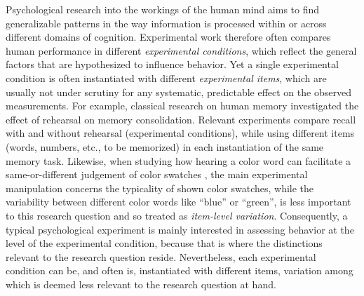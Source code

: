 \documentclass[fleqn]{article}
\begin{document}
Psychological research into the workings of the human mind aims to find generalizable patterns in the way information is processed within or across different domains of cognition.
Experimental work therefore often compares human performance in different \emph{experimental conditions}, which reflect the general factors that are hypothesized to influence behavior.
Yet a single experimental condition is often instantiated with different \emph{experimental items}, which are usually not under scrutiny for any systematic, predictable effect on the observed measurements.
For example, classical research on human memory \citep{AtkinsonShiffrin1968:Human-memory:-A} investigated the effect of rehearsal on memory consolidation.
Relevant experiments compare recall with and without rehearsal (experimental conditions), while using different items (words, numbers, etc., to be memorized) in each instantiation of the same memory task.
Likewise, when studying how hearing a color word can facilitate a same-or-different judgement of color swatches \citep{Rosch1975:The-Nature-of-M}, the main experimental manipulation concerns the typicality of shown color swatches, while the variability between different color words like ``blue'' or ``green'', is less important to this research question and so treated as \emph{item-level variation}.
Consequently, a typical psychological experiment is mainly interested in assessing behavior at the level of the experimental condition, because that is where the distinctions relevant to the research question reside.
Nevertheless, each experimental condition can be, and often is, instantiated with different items, variation among which is deemed less relevant to the research question at hand.
\end{document}
